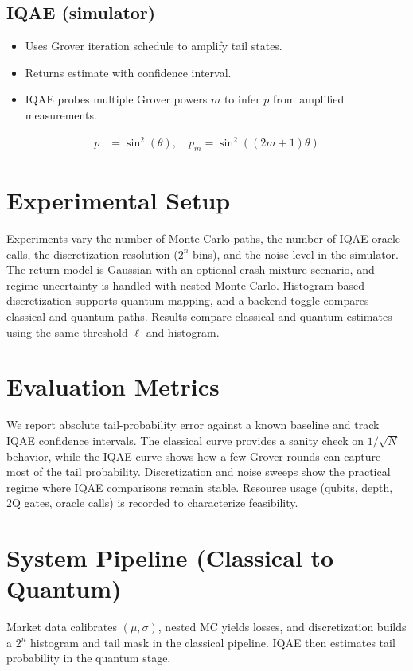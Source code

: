 \documentclass[conference]{IEEEtran}
\begin{document}
\subsection{IQAE (simulator)}
\begin{itemize}
    \item Uses Grover iteration schedule to amplify tail states.
    \item Returns estimate with confidence interval.
    \item IQAE probes multiple Grover powers $m$ to infer $p$ from amplified measurements.
\end{itemize}
\begin{align*}
    p &= \sin^2(\theta), \quad p_m = \sin^2((2m+1)\theta)
\end{align*}

\section{Experimental Setup}
Experiments vary the number of Monte Carlo paths, the number of IQAE oracle calls, the discretization resolution ($2^n$ bins), and the noise level in the simulator. The return model is Gaussian with an optional crash-mixture scenario, and regime uncertainty is handled with nested Monte Carlo. Histogram-based discretization supports quantum mapping, and a backend toggle compares classical and quantum paths. Results compare classical and quantum estimates using the same threshold $\ell$ and histogram.

\section{Evaluation Metrics}
We report absolute tail-probability error against a known baseline and track IQAE confidence intervals. The classical curve provides a sanity check on $1/\sqrt{N}$ behavior, while the IQAE curve shows how a few Grover rounds can capture most of the tail probability. Discretization and noise sweeps show the practical regime where IQAE comparisons remain stable. Resource usage (qubits, depth, 2Q gates, oracle calls) is recorded to characterize feasibility.

\section{System Pipeline (Classical to Quantum)}
Market data calibrates $(\mu,\sigma)$, nested MC yields losses, and discretization builds a $2^n$ histogram and tail mask in the classical pipeline. IQAE then estimates tail probability in the quantum stage.
\end{document}
